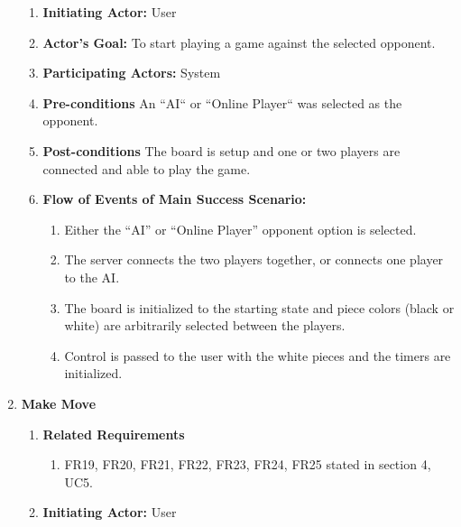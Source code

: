 \documentclass[]{article}
\begin{document}
\begin{enumerate}[{UC}1.]
\begin{enumerate}[{ }]
            \item \textbf{Initiating Actor:} 
                User

            \item \textbf{Actor's Goal:} 
                To start playing a game against the selected opponent.
            
            \item \textbf{Participating Actors:} 
                System
            
            \item \textbf{Pre-conditions}
                An ``AI`` or ``Online Player`` was selected as the opponent.
                
            \item \textbf{Post-conditions}
                The board is setup and one or two players are connected and able to play the game.
                
            \item \textbf{Flow of Events of Main Success Scenario:}
               \begin{enumerate}
                    \item Either the ``AI'' or ``Online Player'' opponent option is selected.
                    \item The server connects the two players together, or connects one player to the AI.
                    \item The board is initialized to the starting state and piece colors (black or white) are arbitrarily selected between the players.
                    \item Control is passed to the user with the white pieces and the timers are initialized.
                \end{enumerate}
        \end{enumerate}
        
    \item \textbf{Make Move}
        \begin{enumerate}[{ }]
            \item \textbf{Related Requirements}
                \begin{enumerate}
                    \item FR19, FR20, FR21, FR22, FR23, FR24, FR25 stated in section 4, UC5.
                \end{enumerate}
            
            \item \textbf{Initiating Actor:} 
                User


\end{enumerate}
\end{enumerate}
\end{document}

